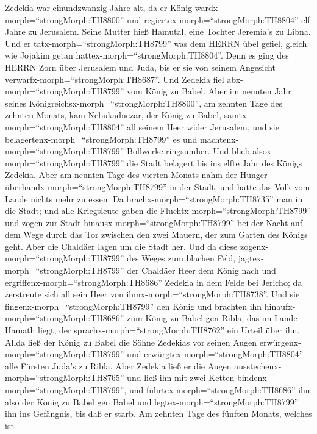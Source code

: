  Zedekia war einundzwanzig Jahre alt, da er König
wardx-morph=``strongMorph:TH8800'' und
regiertex-morph=``strongMorph:TH8804'' elf Jahre zu Jerusalem. Seine
Mutter hieß Hamutal, eine Tochter Jeremia's zu Libna.  Und
er tatx-morph=``strongMorph:TH8799'' was dem HERRN übel gefiel, gleich
wie Jojakim getan hattex-morph=``strongMorph:TH8804''.  Denn
es ging des HERRN Zorn über Jerusalem und Juda, bis er sie von seinem
Angesicht verwarfx-morph=``strongMorph:TH8687''. Und Zedekia fiel
abx-morph=``strongMorph:TH8799'' vom König zu Babel.  Aber
im neunten Jahr seines Königreichsx-morph=``strongMorph:TH8800'', am
zehnten Tage des zehnten Monats, kam Nebukadnezar, der König zu Babel,
samtx-morph=``strongMorph:TH8804'' all seinem Heer wider Jerusalem, und
sie belagertenx-morph=``strongMorph:TH8799'' es und
machtenx-morph=``strongMorph:TH8799'' Bollwerke ringsumher. 
Und blieb alsox-morph=``strongMorph:TH8799'' die Stadt belagert bis ins
elfte Jahr des Königs Zedekia.  Aber am neunten Tage des
vierten Monats nahm der Hunger überhandx-morph=``strongMorph:TH8799'' in
der Stadt, und hatte das Volk vom Lande nichts mehr zu essen.
 Da brachx-morph=``strongMorph:TH8735'' man in die Stadt;
und alle Kriegsleute gaben die Fluchtx-morph=``strongMorph:TH8799'' und
zogen zur Stadt hinausx-morph=``strongMorph:TH8799'' bei der Nacht auf
dem Wege durch das Tor zwischen den zwei Mauern, der zum Garten des
Königs geht. Aber die Chaldäer lagen um die Stadt her.  Und
da diese zogenx-morph=``strongMorph:TH8799'' des Weges zum blachen Feld,
jagtex-morph=``strongMorph:TH8799'' der Chaldäer Heer dem König nach und
ergriffenx-morph=``strongMorph:TH8686'' Zedekia in dem Felde bei
Jericho; da zerstreute sich all sein Heer von
ihmx-morph=``strongMorph:TH8738''.  Und sie
fingenx-morph=``strongMorph:TH8799'' den König und brachten ihn
hinaufx-morph=``strongMorph:TH8686'' zum König zu Babel gen Ribla, das
im Lande Hamath liegt, der sprachx-morph=``strongMorph:TH8762'' ein
Urteil über ihn.  Allda ließ der König zu Babel die Söhne
Zedekias vor seinen Augen erwürgenx-morph=``strongMorph:TH8799'' und
erwürgtex-morph=``strongMorph:TH8804'' alle Fürsten Juda's zu Ribla.
 Aber Zedekia ließ er die Augen
ausstechenx-morph=``strongMorph:TH8765'' und ließ ihn mit zwei Ketten
bindenx-morph=``strongMorph:TH8799'', und
führtex-morph=``strongMorph:TH8686'' ihn also der König zu Babel gen
Babel und legtex-morph=``strongMorph:TH8799'' ihn ins Gefängnis, bis daß
er starb.  Am zehnten Tage des fünften Monats, welches ist
